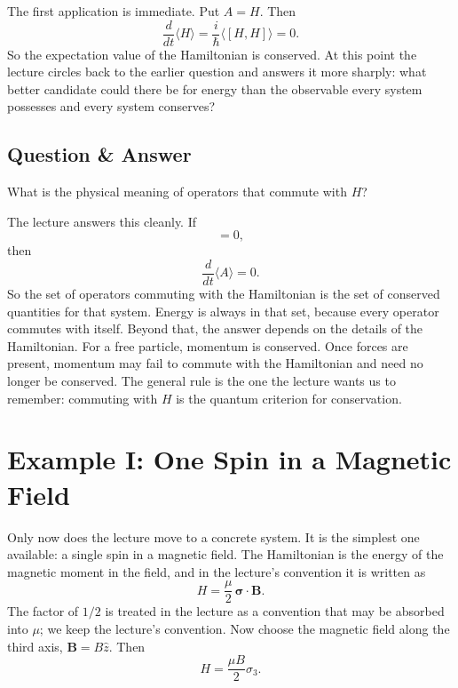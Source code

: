The first application is immediate. Put \(A=H\). Then
\begin{equation}
\frac{d}{dt}\langle H\rangle
=
\frac{i}{\hbar}\langle [H,H]\rangle
=
0.
\end{equation}
So the expectation value of the Hamiltonian is conserved. At this point the lecture circles back to the earlier question and answers it more sharply: what better candidate could there be for energy than the observable every system possesses and every system conserves?

\subsection{Question \& Answer}

What is the physical meaning of operators that commute with \(H\)?

The lecture answers this cleanly. If
\begin{equation}
[H,A]=0,
\end{equation}
then
\begin{equation}
\frac{d}{dt}\langle A\rangle=0.
\end{equation}
So the set of operators commuting with the Hamiltonian is the set of conserved quantities for that system. Energy is always in that set, because every operator commutes with itself. Beyond that, the answer depends on the details of the Hamiltonian. For a free particle, momentum is conserved. Once forces are present, momentum may fail to commute with the Hamiltonian and need no longer be conserved. The general rule is the one the lecture wants us to remember: commuting with \(H\) is the quantum criterion for conservation.

\section{Example I: One Spin in a Magnetic Field}

Only now does the lecture move to a concrete system. It is the simplest one available: a single spin in a magnetic field. The Hamiltonian is the energy of the magnetic moment in the field, and in the lecture's convention it is written as
\begin{equation}
H=\frac{\mu}{2}\,\boldsymbol{\sigma}\cdot\mathbf{B}.
\end{equation}
The factor of \(1/2\) is treated in the lecture as a convention that may be absorbed into \(\mu\); we keep the lecture's convention. Now choose the magnetic field along the third axis, \(\mathbf{B}=B\hat z\). Then
\begin{equation}
H=\frac{\mu B}{2}\sigma_3.
\end{equation}

